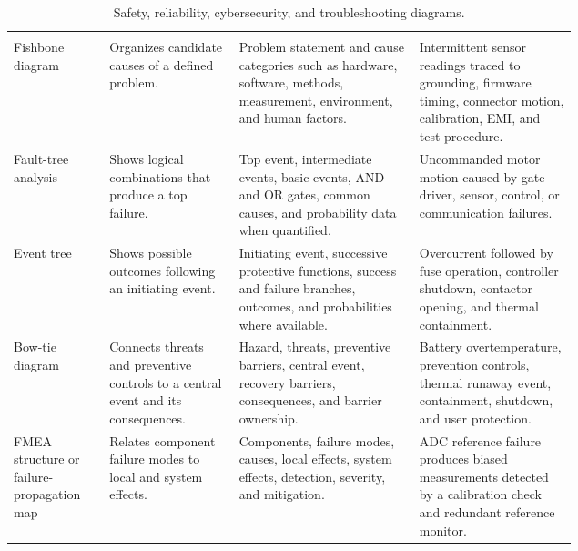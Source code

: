 
\begin{singlespace}
\setlength{\LTcapwidth}{\linewidth}
\begin{longtable}{@{}L{0.17\linewidth} L{0.23\linewidth} L{0.32\linewidth} L{\tabcolsep\relax}@{}}
\caption{Safety, reliability, cybersecurity, and troubleshooting diagrams.}\label{tab:risk-diagrams}\\
 &  &  &  \\
\midrule
\endfirsthead
{}
 &  &  &  \\
\midrule
\endhead
\bottomrule
\endfoot
Fishbone diagram & Organizes candidate causes of a defined problem. & Problem statement and cause categories such as hardware, software, methods, measurement, environment, and human factors. & Intermittent sensor readings traced to grounding, firmware timing, connector motion, calibration, EMI, and test procedure. \\
\addlinespace[3pt]
Fault-tree analysis & Shows logical combinations that produce a top failure. & Top event, intermediate events, basic events, AND and OR gates, common causes, and probability data when quantified. & Uncommanded motor motion caused by gate-driver, sensor, control, or communication failures. \\
\addlinespace[3pt]
Event tree & Shows possible outcomes following an initiating event. & Initiating event, successive protective functions, success and failure branches, outcomes, and probabilities where available. & Overcurrent followed by fuse operation, controller shutdown, contactor opening, and thermal containment. \\
\addlinespace[3pt]
Bow-tie diagram & Connects threats and preventive controls to a central event and its consequences. & Hazard, threats, preventive barriers, central event, recovery barriers, consequences, and barrier ownership. & Battery overtemperature, prevention controls, thermal runaway event, containment, shutdown, and user protection. \\
\addlinespace[3pt]
FMEA structure or failure-propagation map & Relates component failure modes to local and system effects. & Components, failure modes, causes, local effects, system effects, detection, severity, and mitigation. & ADC reference failure produces biased measurements detected by a calibration check and redundant reference monitor. \\

\end{longtable}
\end{singlespace}
